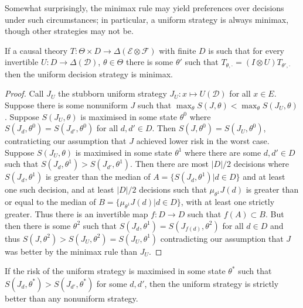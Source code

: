 Somewhat surprisingly, the minimax rule may yield preferences over decisions under such circumstances; in particular, a uniform strategy is always minimax, though other strategies may not be.

\begin{theorem}
If a causal theory $T:\Theta\times D\to \Delta(\mathcal{E}\otimes\mathcal{F})$ with finite $D$ is such that for every invertible $U:D\to \Delta(\mathcal{D})$, $\theta\in \Theta$ there is some $\theta'$ such that $T_{\theta,\cdot} = (I\otimes U)T_{\theta',\cdot}$ then the uniform decision strategy is minimax.
\end{theorem}

\begin{proof}
Call $J_U$ the stubborn uniform strategy $J_U:x\mapsto U(\mathcal{D})$ for all $x\in E$. Suppose there is some nonuniform $J$ such that $\max_\theta S(J,\theta) < \max_\theta S(J_U,\theta)$. Suppose $S(J_U,\theta)$ is maximised in some state $\theta^0$ where $S(J_d,\theta^0)=S(J_{d'},\theta^0)$ for all $d,d'\in D$. Then $S(J,\theta^0)=S(J_U,\theta^0)$, contraticting our assumption that $J$ achieved lower risk in the worst case. Suppose $S(J_U,\theta)$ is maximised in some state $\theta^1$ where there are some $d,d'\in D$ such that $S(J_d,\theta^1)>S(J_{d'},\theta^1)$. Then there are most $|D|/2$ decisions where $S(J_d,\theta^1)$ is greater than the median of $A=\{S(J_d,\theta^1)|d\in D\}$ and at least one such decision, and at least $|D|/2$ decisions such that $\mu_{\theta^1} J(d)$ is greater than or equal to the median of $B=\{\mu_{\theta^1} J(d)|d\in D\}$, with at least one strictly greater. Thus there is an invertible map $f:D\to D$ such that $f(A)\subset B$. But then there is some $\theta^2$ such that $S(J_d,\theta^1)=S(J_{f(d)},\theta^2)$ for all $d\in D$ and thus $S(J,\theta^2)> S(J_U,\theta^2) = S(J_U,\theta^1)$ contradicting our assumption that $J$ was better by the minimax rule than $J_U$.
\end{proof}

\begin{corollary}
If the risk of the uniform strategy is maximised in some state $\theta^*$ such that $S(J_d,\theta^*)>S(J_{d'},\theta^*)$ for some $d,d'$, then the uniform strategy is strictly better than any nonuniform strategy.
\end{corollary}

